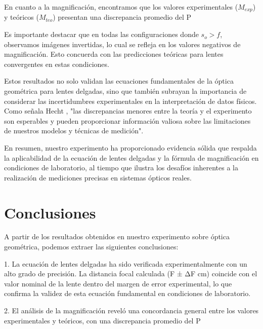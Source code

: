 \documentclass[twocolumn,a4paper,11pt]{scrartcl}
\begin{document}
En cuanto a la magnificación, encontramos que los valores experimentales ($M_{exp}$) y teóricos ($M_{teo}$) presentan una discrepancia promedio del P%

Es importante destacar que en todas las configuraciones donde $s_o > f$, observamos imágenes invertidas, lo cual se refleja en los valores negativos de magnificación. Esto concuerda con las predicciones teóricas para lentes convergentes en estas condiciones.

Estos resultados no solo validan las ecuaciones fundamentales de la óptica geométrica para lentes delgadas, sino que también subrayan la importancia de considerar las incertidumbres experimentales en la interpretación de datos físicos. Como señala Hecht \cite{hecht}, "las discrepancias menores entre la teoría y el experimento son esperables y pueden proporcionar información valiosa sobre las limitaciones de nuestros modelos y técnicas de medición".

En resumen, nuestro experimento ha proporcionado evidencia sólida que respalda la aplicabilidad de la ecuación de lentes delgadas y la fórmula de magnificación en condiciones de laboratorio, al tiempo que ilustra los desafíos inherentes a la realización de mediciones precisas en sistemas ópticos reales.


\section{Conclusiones}

A partir de los resultados obtenidos en nuestro experimento sobre óptica geométrica, podemos extraer las siguientes conclusiones:

1. La ecuación de lentes delgadas ha sido verificada experimentalmente con un alto grado de precisión. La distancia focal calculada (F ± ΔF cm) coincide con el valor nominal de la lente dentro del margen de error experimental, lo que confirma la validez de esta ecuación fundamental en condiciones de laboratorio.

2. El análisis de la magnificación reveló una concordancia general entre los valores experimentales y teóricos, con una discrepancia promedio del P%
\end{document}
